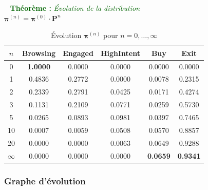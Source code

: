 \documentclass[11pt,a4paper]{article}
\newcommand{\vect}[1]{\boldsymbol{#1}}
\newenvironment{thmbox}[1]{%
  \vspace{3pt}\begin{framed}
  \noindent{\color{DarkGreen}\rule{0.3cm}{3pt}}~%
  \textcolor{DarkGreen}{\textbf{Théorème :} \textit{#1}}\\[3pt]}
  {\end{framed}\vspace{3pt}}
\newcommand{\mat}[1]{\mathbf{#1}}
\begin{document}
\begin{thmbox}{Évolution de la distribution}
$\vect{\pi}^{(n)} = \vect{\pi}^{(0)}\cdot\mat{P}^n$
\end{thmbox}

\begin{table}[H]
\centering
\caption{Évolution $\vect{\pi}^{(n)}$ pour $n = 0,\ldots,\infty$}
\label{tab:pin}
\begin{tabular}{c|ccccc}
\toprule
\rowcolor{DarkBlue}
\color{white}$n$ &
\color{white}Browsing &
\color{white}Engaged &
\color{white}HighIntent &
\color{white}Buy &
\color{white}Exit \\
\midrule
0  & \textbf{1.0000} & 0.0000 & 0.0000 & 0.0000 & 0.0000 \\
\rowcolor{LightGray}
1  & 0.4836 & 0.2772 & 0.0000 & 0.0078 & 0.2315 \\
2  & 0.2339 & 0.2791 & 0.0425 & 0.0171 & 0.4274 \\
\rowcolor{LightGray}
3  & 0.1131 & 0.2109 & 0.0771 & 0.0259 & 0.5730 \\
5  & 0.0265 & 0.0893 & 0.0981 & 0.0397 & 0.7465 \\
\rowcolor{LightGray}
10 & 0.0007 & 0.0059 & 0.0508 & 0.0570 & 0.8857 \\
20 & 0.0000 & 0.0000 & 0.0063 & 0.0649 & 0.9288 \\
\rowcolor{DarkBlue}
\color{white}$\infty$ &
  \color{white}0.0000 & \color{white}0.0000 & \color{white}0.0000 &
  \color{white}\textbf{0.0659} & \color{white}\textbf{0.9341} \\
\bottomrule
\end{tabular}
\end{table}

\subsubsection{Graphe d'évolution}
\end{document}
